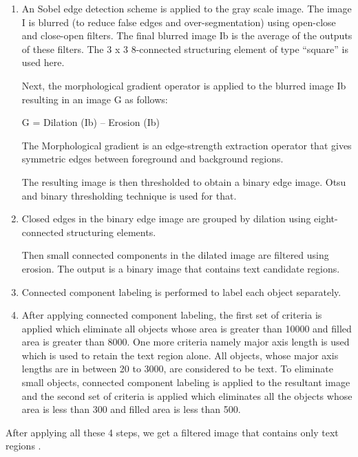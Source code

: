 \begin{enumerate}
	\item An Sobel edge detection scheme is applied to the gray scale image. The image I is blurred (to reduce false edges and over-segmentation) using open-close and close-open filters.
	The final blurred image Ib is the average of the outputs of these filters. The 3 x 3 8-connected structuring element of type ``square'' is used here.

	Next, the morphological gradient operator \nocite{morph} is applied to the blurred image Ib resulting in an image G as follows:
	\begin{center}
	G = Dilation (Ib) – Erosion (Ib)
	\end{center}

	The Morphological gradient is an edge-strength extraction operator that gives symmetric edges between foreground and background regions.

	The resulting image is then thresholded to obtain a binary edge image. Otsu and binary thresholding technique is used
	for that. \nocite{otsu}

	\item Closed edges in the binary edge image are grouped by dilation using eight- connected structuring elements.

	Then small connected components in the dilated image are filtered using erosion. The output is a binary image
	that contains text candidate regions.

	\item Connected component labeling is performed to label each object separately.

	\item After applying connected component labeling, the first set of criteria is applied which eliminate all objects whose area is greater than 10000 and filled area is greater than 8000.
	One more criteria namely major axis length is used which is used to retain the text region alone.
	All objects, whose major axis lengths are in between 20 to 3000, are considered to be text.
	To eliminate small objects, connected component labeling is applied to the resultant image and the second set of criteria is applied which eliminates all the objects whose area is less than 300 and filled area is less than 500.
\end{enumerate}

After applying all these 4 steps, we get a filtered image that contains only text regions \cite{text_detect}.

